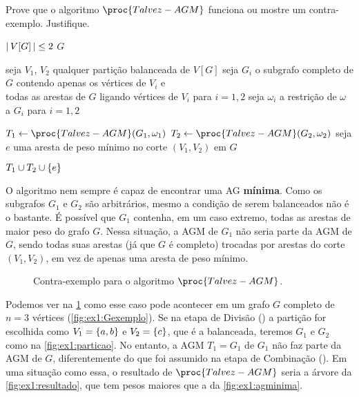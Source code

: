 Prove que o algoritmo $\proc{Talvez-AGM}$ funciona ou mostre um contra-exemplo.
Justifique.

\begin{codebox}

    \li \Se ${\left\lvert\,V[G]\,\right\rvert} \leq 2$ \Entao \Devolva $G$

    \li seja $V_1$, $V_2$ qualquer partição balanceada de $V[G]$
        \label{linha:ex1:divisao}
    \li seja $G_i$ o subgrafo completo de $G$ contendo apenas os vértices de $V_i$ e \\
    \qquad todas as arestas de $G$ ligando vértices de $V_i$ para $i=1,2$
    \li seja $\omega_i$ a restrição de $\omega$ a $G_i$ para $i=1,2$

    \li $T_1 \Recebe \proc{Talvez-AGM}(G_1, \omega_1)$
    \li $T_2 \Recebe \proc{Talvez-AGM}(G_2, \omega_2)$
    \li seja $e$ uma aresta de peso mínimo no corte $(V_1, V_2)$ em $G$

    \li \Devolva $T_1 \cup T_2 \cup \set{e}$
        \label{linha:ex1:combinacao}
\end{codebox}

\itemdsep
\newpage

O algoritmo nem sempre é capaz de encontrar uma AG \textbf{mínima}. Como os subgrafos $G_1$ e $G_2$ são arbitrários, mesmo a condição de serem balanceados não é o bastante. É possível que $G_1$ contenha, em um caso extremo, todas as arestas de maior peso do grafo $G$. Nessa situação, a AGM de $G_1$ não seria parte da AGM de $G$, sendo todas suas arestas (já que $G$ é completo) trocadas por arestas do corte $(V_1,V_2)$, em vez de apenas uma aresta de peso mínimo.

\begin{figure}[H]
    \centering
    

    \caption{Contra-exemplo para o algoritmo $\proc{Talvez-AGM}$.}
    \label{fig:ex1}
\end{figure}

Podemos ver na \cref{fig:ex1} como esse caso pode acontecer em um grafo $G$ completo de $n = 3$ vértices (\cref{fig:ex1:Gexemplo}). Se na etapa de Divisão () a partição for escolhida como $V_1 = \set{a, b}$ e $V_2 = \set{c}$, que é a balanceada, teremos $G_1$ e $G_2$ como na \cref{fig:ex1:particao}. No entanto, a AGM $T_1 = G_1$ de $G_1$ não faz parte da AGM de $G$, diferentemente do que foi assumido na etapa de Combinação (). Em uma situação como essa, o resultado de $\proc{Talvez-AGM}$ seria a árvore da \cref{fig:ex1:resultado}, que tem pesos maiores que a da \cref{fig:ex1:agminima}.
